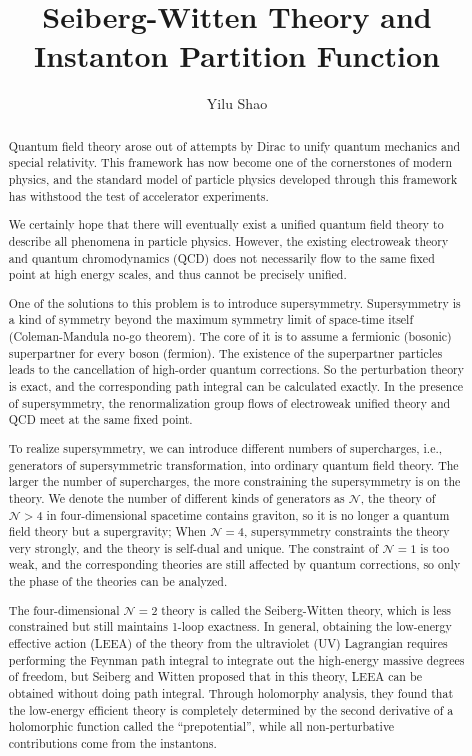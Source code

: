\documentclass{article}
\title{Seiberg-Witten Theory and Instanton Partition Function}
\author{Yilu Shao}
\date{}
\begin{document}
\maketitle

\tableofcontents
\newpage

\begin{abstract}
Quantum field theory arose out of attempts by Dirac to unify quantum mechanics and special relativity. This framework has now become one of the cornerstones of modern physics, and the standard model of particle physics developed through this framework has withstood the test of accelerator experiments. 

We certainly hope that there will eventually exist a unified quantum field theory to describe all phenomena in particle physics. However, the existing electroweak theory and quantum chromodynamics (QCD) does not necessarily flow to the same fixed point at high energy scales, and thus cannot be precisely unified.

One of the solutions to this problem is to introduce supersymmetry. Supersymmetry is a kind of symmetry beyond the maximum symmetry limit of space-time itself (Coleman-Mandula no-go theorem). The core of it is to assume a fermionic (bosonic) superpartner for every boson (fermion). The existence of the superpartner particles leads to the cancellation of high-order quantum corrections. So the perturbation theory is exact, and the corresponding path integral can be calculated exactly. In the presence of supersymmetry, the renormalization group flows of electroweak unified theory and QCD meet at the same fixed point.

To realize supersymmetry, we can introduce different numbers of supercharges, i.e., generators of supersymmetric transformation, into ordinary quantum field theory. The larger the number of supercharges, the more constraining the supersymmetry is on the theory. We denote the number of different kinds of generators as $\mathcal{N}$, the theory of $\mathcal{N}>4$ in four-dimensional spacetime contains graviton, so it is no longer a quantum field theory but a supergravity; When $\mathcal{N}=4$, supersymmetry constraints the theory very strongly, and the theory is self-dual and unique. The constraint of $\mathcal{N}=1$ is too weak, and the corresponding theories are still affected by quantum corrections, so only the phase of the theories can be analyzed.

The four-dimensional $\mathcal{N}=2$ theory is called the Seiberg-Witten theory, which is less constrained but still maintains 1-loop exactness. In general, obtaining the low-energy effective action (LEEA) of the theory from the ultraviolet (UV) Lagrangian requires performing the Feynman path integral to integrate out the high-energy massive degrees of freedom, but Seiberg and Witten proposed that in this theory, LEEA can be obtained without doing path integral. Through holomorphy analysis, they found that the low-energy efficient theory is completely determined by the second derivative of a holomorphic function called the ``prepotential'', while all non-perturbative contributions come from the instantons.


\end{abstract}
\end{document}
